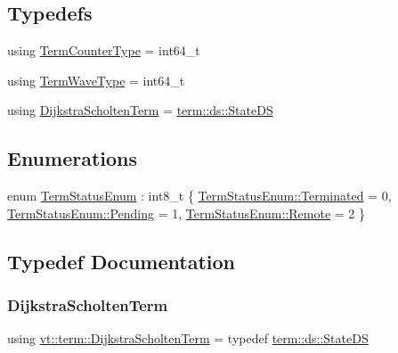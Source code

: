 \subsection*{Typedefs}
\begin{DoxyCompactItemize}
\item 
using \hyperlink{namespacevt_1_1term_a4fd378cdb0c36683afc1b3399d685f7f}{Term\+Counter\+Type} = int64\+\_\+t
\item 
using \hyperlink{namespacevt_1_1term_a4af17606966b2b5a6cba523bc39095a3}{Term\+Wave\+Type} = int64\+\_\+t
\item 
using \hyperlink{namespacevt_1_1term_a886197ad3670cebba77f6b87ca59b4c9}{Dijkstra\+Scholten\+Term} = \hyperlink{structvt_1_1term_1_1ds_1_1_state_d_s}{term\+::ds\+::\+State\+DS}
\end{DoxyCompactItemize}
\subsection*{Enumerations}
\begin{DoxyCompactItemize}
\item 
enum \hyperlink{namespacevt_1_1term_ad8ec9b371608fc88e7fdeef219785b27}{Term\+Status\+Enum} \+: int8\+\_\+t \{ \hyperlink{namespacevt_1_1term_ad8ec9b371608fc88e7fdeef219785b27afba9c4daa2dd29d1077d32d965320ac1}{Term\+Status\+Enum\+::\+Terminated} = 0, 
\hyperlink{namespacevt_1_1term_ad8ec9b371608fc88e7fdeef219785b27a2d13df6f8b5e4c5af9f87e0dc39df69d}{Term\+Status\+Enum\+::\+Pending} = 1, 
\hyperlink{namespacevt_1_1term_ad8ec9b371608fc88e7fdeef219785b27af8508f576cd3f742dfc268258dcdf0dd}{Term\+Status\+Enum\+::\+Remote} = 2
 \}
\end{DoxyCompactItemize}


\subsection{Typedef Documentation}
\mbox{\label{namespacevt_1_1term_a886197ad3670cebba77f6b87ca59b4c9}} 
\subsubsection{\texorpdfstring{Dijkstra\+Scholten\+Term}{DijkstraScholtenTerm}}
{\footnotesize\ttfamily using \hyperlink{namespacevt_1_1term_a886197ad3670cebba77f6b87ca59b4c9}{vt\+::term\+::\+Dijkstra\+Scholten\+Term} = typedef \hyperlink{structvt_1_1term_1_1ds_1_1_state_d_s}{term\+::ds\+::\+State\+DS}}


